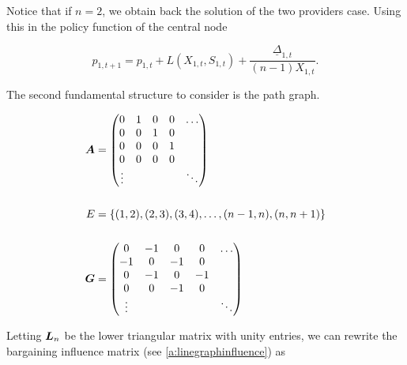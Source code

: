 Notice that if $n = 2$, we obtain back the solution of the two providers case. Using this in the policy function of the central node

\begin{equation} \label{policy_star}
  p_{1, t+1} = p_{1, t} + L(X_{1, t}, S_{1, t}) + \frac{\underline{\Delta}_{1, t}}{(n-1) X_{1, t}}.
\end{equation}

The second fundamental structure to consider is the path graph.

\vspace{5mm}
\begin{minipage}{.5\textwidth}
  \resizebox{\textwidth}{!}{}
\end{minipage}
\begin{minipage}{.5\textwidth}
  \begin{equation*}
    \begin{split}
      \matr{A} &= \begin{pmatrix}
        0      & 1 & 0 & 0 & \ldots \\
        0      & 0 & 1 & 0 &        \\
        0      & 0 & 0 & 1 &        \\
        0      & 0 & 0 & 0 &        \\
        \vdots &   &   &   & \ddots
      \end{pmatrix} \\
      \vspace{5mm} \\
      E &= \set{(1, 2), (2, 3), (3, 4), \ldots, (n-1, n), (n, n+1)} \\
      \vspace{5mm} \\
      \G &= \begin{pmatrix}
        0      & -1 & 0  & 0  & \ldots \\
        -1     & 0  & -1 & 0  &        \\
        0      & -1 & 0  & -1 &        \\
        0      & 0  & -1 & 0  &        \\
        \vdots &    &    &    & \ddots
      \end{pmatrix}
    \end{split}
  \end{equation*}
\end{minipage}
\vspace{5mm}

Letting $\bm{L}_n$ be the lower triangular matrix with unity entries, we can rewrite the bargaining influence matrix (see \ref{a:linegraphinfluence}) as

